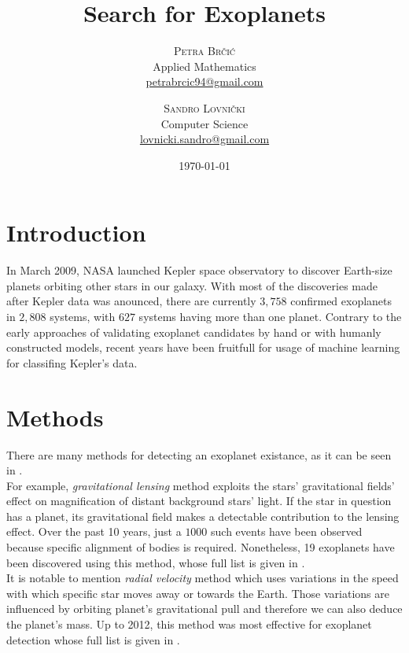 \documentclass[twoside]{article}
\title{Search for Exoplanets} %
\author{%
\textsc{Petra Br\v{c}i\'c}\\%
\normalsize Applied Mathematics \\
\normalsize \href{mailto:petrabrcic94@gmail.com}{petrabrcic94@gmail.com} 
\and
\textsc{Sandro Lovni\v{c}ki}\\%
\normalsize Computer Science \\ 
\normalsize \href{mailto:lovnicki.sandro@gmail.com}{lovnicki.sandro@gmail.com}
}
\date{\today}
\begin{document}
\maketitle
\tableofcontents
\newpage

\begin{multicols}{2}

\section{Introduction}
In March 2009, NASA launched Kepler space observatory to discover Earth-size planets orbiting other stars in our galaxy. With most of the discoveries made after Kepler data was anounced, there are currently $3,758$ confirmed exoplanets in $2,808$ systems, with $627$ systems having more than one planet. Contrary to the early approaches of validating exoplanet candidates by hand or with humanly constructed models, recent years have been fruitfull for usage of machine learning for classifing Kepler's data.

\section{Methods}
There are many methods for detecting an exoplanet existance, as it can be seen in \cite{exo:methods}.\\
For example, \textit{gravitational lensing} method exploits the stars' gravitational fields' effect on magnification of distant background stars' light. If the star in question has a planet, its gravitational field makes a detectable contribution to the lensing effect. Over the past 10 years, just a $1000$ such events have been observed because specific alignment of bodies is required. Nonetheless, 19 exoplanets have been discovered using this method, whose full list is given in \cite{microlensing:exos}.\\
It is notable to mention \textit{radial velocity} method which uses variations in the speed with which specific star moves away or towards the Earth. Those variations are influenced by orbiting planet's gravitational pull and therefore we can also deduce the planet's mass. Up to 2012, this method was most effective for exoplanet detection whose full list is given in \cite{radial:exos}.


\end{multicols}
\end{document}
